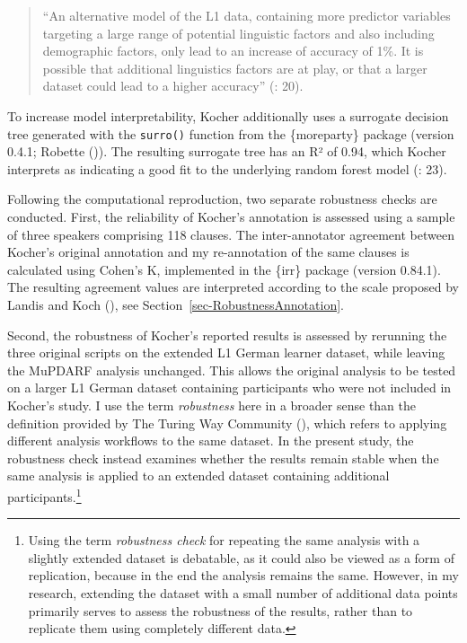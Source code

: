 \documentclass[
  letterpaper,
  DIV=11,
  numbers=noendperiod]{scrartcl}
\begin{document}
\begin{quote}
``An alternative model of the L1 data, containing more predictor
variables targeting a large range of potential linguistic factors and
also including demographic factors, only lead to an increase of accuracy
of 1\%. It is possible that additional linguistics factors are at play,
or that a larger dataset could lead to a higher accuracy''
(: 20).
\end{quote}

To increase model interpretability, Kocher additionally uses a surrogate
decision tree generated with the \texttt{surro()} function from the
\{moreparty\} package (version 0.4.1; Robette
()). The resulting surrogate tree has an
R² of 0.94, which Kocher interprets as indicating a good fit to the
underlying random forest model
(: 23).

Following the computational reproduction, two separate robustness checks
are conducted. First, the reliability of Kocher's annotation is assessed
using a sample of three speakers comprising 118 clauses. The
inter-annotator agreement between Kocher's original annotation and my
re-annotation of the same clauses is calculated using Cohen's K,
implemented in the \{irr\} package (version 0.84.1). The resulting
agreement values are interpreted according to the scale proposed by
Landis and Koch (), see
Section~\ref{sec-RobustnessAnnotation}.

Second, the robustness of Kocher's reported results is assessed by
rerunning the three original scripts on the extended L1 German learner
dataset, while leaving the MuPDARF analysis unchanged. This allows the
original analysis to be tested on a larger L1 German dataset containing
participants who were not included in Kocher's study. I use the term
\emph{robustness} here in a broader sense than the definition provided
by The Turing Way Community
(), which refers to
applying different analysis workflows to the same dataset. In the
present study, the robustness check instead examines whether the results
remain stable when the same analysis is applied to an extended dataset
containing additional participants.\footnote{Using the term
  \emph{robustness check} for repeating the same analysis with a
  slightly extended dataset is debatable, as it could also be viewed as
  a form of replication, because in the end the analysis remains the
  same. However, in my research, extending the dataset with a small
  number of additional data points primarily serves to assess the
  robustness of the results, rather than to replicate them using
  completely different data.}
\end{document}
